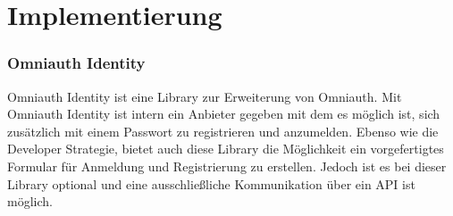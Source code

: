 \documentclass[11pt]{article}
\begin{document}
	

	
	\section{Implementierung}
	\label{sec: implementation}
	
	\subsubsection{Omniauth Identity}
	\label{sec: omniauth_identity}
	Omniauth Identity ist eine Library zur Erweiterung von Omniauth. Mit Omniauth Identity ist intern ein Anbieter gegeben mit dem es möglich ist, sich zusätzlich mit einem Passwort zu registrieren und anzumelden. Ebenso wie die Developer Strategie, bietet auch diese Library die Möglichkeit ein vorgefertigtes Formular für Anmeldung und Registrierung zu erstellen. Jedoch ist es bei dieser Library optional und eine ausschließliche Kommunikation über ein API ist möglich. 
	
\end{document}
